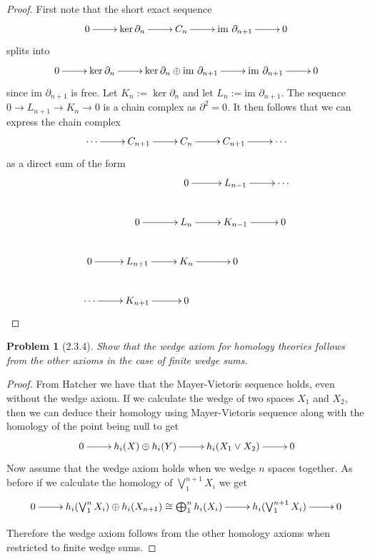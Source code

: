 \documentclass[10pt]{article}
\newcommand{\sk}{\vskip 10mm}
\theoremstyle{plain}
\newtheorem{problem}{Problem}
\theoremstyle{remark}
\begin{document}
\begin{proof}
  First note that the short exact sequence
  \[
    \xymatrix{
      0\ar[r] & \ker\partial_n\ar[r] & C_n \ar[r] & \text{im\ }\partial_{n+1} \ar[r] & 0
    }
  \]
  splits into
  \[
    \xymatrix{
      0\ar[r] & \ker\partial_n\ar[r] & \ker\partial_n\oplus\text{im\ }\partial_{n+1} \ar[r] & \text{im\ }\partial_{n+1} \ar[r] & 0
    }
  \]
  since $\text{im\ }\partial_{n+1}$ is free. Let $K_n:=\ker\partial_n$ and let $L_n:=\text{im\ }\partial_{n+1}$.
  The sequence $0\rightarrow L_{n+1}\rightarrow K_n\rightarrow 0$ is a chain complex as $\partial^2=0$. It then follows that we
  can express the chain complex
  \[
    \xymatrix{
      \cdots \ar[r] & C_{n+1} \ar[r] & C_n \ar[r] & C_{n+1} \ar[r] & \cdots
    }
  \]
  as a direct sum of the form
  \[
    \xymatrix{
      & & 0 \ar[r] & L_{n-1} \ar[r] & \cdots\\
      & 0 \ar[r] & L_n \ar[r] & K_{n-1} \ar[r] & 0\\
      0 \ar[r] & L_{n+1} \ar[r] & K_n \ar[r] & 0 &\\
      \cdots \ar[r] & K_{n+1} \ar[r] & 0 & &\\
    }
  \]
\end{proof}

\sk

\begin{problem}[2.3.4]
  Show that the wedge axiom for homology theories follows from the other
  axioms in the case of finite wedge sums.
\end{problem}

\begin{proof}
  From Hatcher we have that the Mayer-Vietoris sequence holds, even without
  the wedge axiom. If we calculate the wedge of two spaces $X_1$ and $X_2$, then
  we can deduce their homology using
  Mayer-Vietoris sequence along with the homology of the point being null to
  get
  \[
    \xymatrix{
      0 \ar[r] & h_i(X)\oplus h_i(Y) \ar[r] & h_i(X_1\vee X_2) \ar[r] & 0
    }
  \]
  Now assume that the wedge axiom holds when we wedge $n$ spaces together. As before
  if we calculate the homology of $\bigvee_1^{n+1}X_{i}$ we get
  \[
    \xymatrix{
      0 \ar[r] & h_i(\bigvee_1^n X_i)\oplus h_i(X_{n+1})\cong\bigoplus_1^n h_i(X_i) \ar[r] & h_i(\bigvee_1^{n+1}X_i) \ar[r] & 0
    }
  \]

  Therefore the wedge axiom follows from the other homology axioms when restricted
  to finite wedge sums.
\end{proof}

\sk
\end{document}
